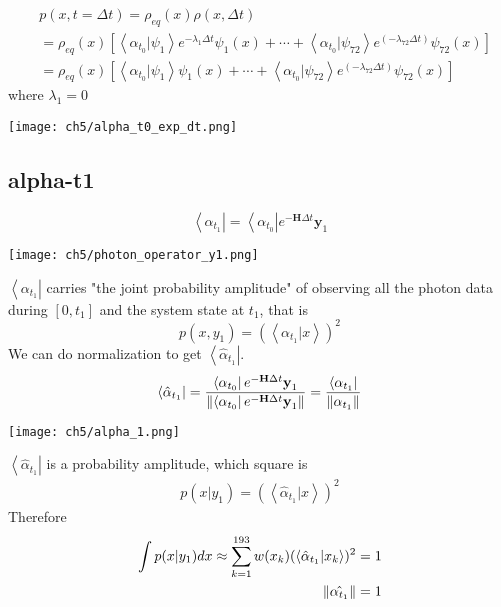 \begin{definition}[$\rho(x, t=\Delta t) = \left<\alpha_{t_0}| e^{-\textbf{H}\Delta t}|x \right>$]
\begin{align*}
        &p(x,t=\Delta t) = \rho_{eq}(x) \rho(x, \Delta t)\\
        &= \rho_{eq}(x)[ \left< \alpha_{t_0} | \psi_1 \right> e^{-\lambda_{1}\Delta t}\psi_1(x) + \cdots+ \left< \alpha_{t_0} | \psi_{72} \right> e^{(-\lambda_{72}\Delta t)}\psi_{72}(x)]  \\
        &=  \rho_{eq}(x)[ \left< \alpha_{t_0} | \psi_1 \right>\psi_1(x)+ \cdots + \left< \alpha_{t_0} | \psi_{72} \right> e^{(-\lambda_{72}\Delta t)}\psi_{72}(x)]  
\end{align*}
where $\lambda_1 = 0$
\begin{center}
        \texttt{[image: ch5/alpha\_t0\_exp\_dt.png]}   
\end{center}
\end{definition}

\subsection{alpha-t1}
\begin{definition}
\begin{equation}
        \left< \alpha_{t_1} \right| = \left< \alpha_{t_0} \right| e^{-\textbf{H} \Delta t} \textbf{y}_1     
\end{equation}
\begin{center}
        \texttt{[image: ch5/photon\_operator\_y1.png]}   
\end{center}
$\left< \alpha_{t_1} \right|$ carries "the joint probability amplitude" of observing all the photon data during $[0, t_1]$ and the system state at $t_1$, that is
\begin{equation}
        p(x, y_1) = (\left< \alpha_{t_1} | x \right>)^2
\end{equation}
We can do normalization to get $\left< \hat{\alpha}_{t_1} \right|$.
\begin{equation}
        \left< \hat{\alpha}_{t_1} \right| = \frac{\left< \alpha_{t_0} \right| e^{-\textbf{H}\Delta t} \textbf{y}_1}{\left\lVert\left< \alpha_{t_0} \right| e^{-\textbf{H}\Delta t} \textbf{y}_1\right\rVert} = \frac{\left< \alpha_{t_{1}} \right|}{\left\lVert\alpha_{t_{1}}\right\rVert}
\end{equation}
\begin{center}
        \texttt{[image: ch5/alpha\_1.png]}   
\end{center}
$\left< \hat{\alpha}_{t_1} \right|$ is a probability amplitude, which square is 
\begin{align*}
        p(x | y_1) =  (\left< \hat{\alpha}_{t_1} | x \right>)^2
\end{align*}
Therefore
\begin{align*}
        \int p(x|y_1) dx \approx \sum_{k=1}^{193}w(x_k)(\left< \hat{\alpha}_{t_1} | x_k \right>)^2 &= 1 \\
        \left\lVert\hat{\alpha_{t_1}}\right\rVert &= 1
\end{align*}
\end{definition}

